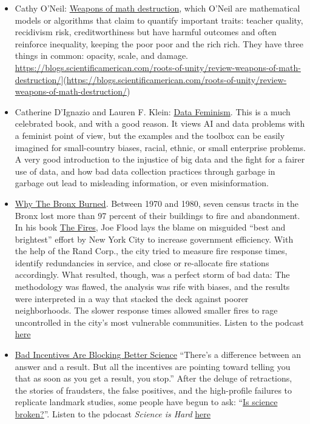 \documentclass[
  a4paper,
  openany, a4paper, oneside]{book}
\begin{document}
\begin{itemize}
\item
  Cathy O'Neil: \href{https://en.wikipedia.org/wiki/Weapons_of_Math_Destruction}{Weapons of math destruction}, which O'Neil are mathematical models or algorithms that claim to quantify important traits: teacher quality, recidivism risk, creditworthiness but have harmful outcomes and often reinforce inequality, keeping the poor poor and the rich rich. They have three things in common: opacity, scale, and damage. \url{https://blogs.scientificamerican.com/roots-of-unity/review-weapons-of-math-destruction/}{]}(\url{https://blogs.scientificamerican.com/roots-of-unity/review-weapons-of-math-destruction/})
\item
  Catherine D'Ignazio and Lauren F. Klein: \href{https://mitpress.mit.edu/books/data-feminism}{Data Feminism}. This is a much celebrated book, and with a good reason. It views AI and data problems with a feminist point of view, but the examples and the toolbox can be easily imagined for small-country biases, racial, ethnic, or small enterprise problems. A very good introduction to the injustice of big data and the fight for a fairer use of data, and how bad data collection practices through garbage in garbage out lead to misleading information, or even misinformation.
\item
  \href{https://fivethirtyeight.com/features/why-the-bronx-really-burned/}{Why The Bronx Burned}. Between 1970 and 1980, seven census tracts in the Bronx lost more than 97 percent of their buildings to fire and abandonment. In his book \href{https://www.amazon.com/Fires-Computer-Intentions-City-Determined/dp/1594485062}{The Fires}, Joe Flood lays the blame on misguided ``best and brightest'' effort by New York City to increase government efficiency. With the help of the Rand Corp., the city tried to measure fire response times, identify redundancies in service, and close or re-allocate fire stations accordingly. What resulted, though, was a perfect storm of bad data: The methodology was flawed, the analysis was rife with biases, and the results were interpreted in a way that stacked the deck against poorer neighborhoods. The slower response times allowed smaller fires to rage uncontrolled in the city's most vulnerable communities. Listen to the podcast \href{https://podcasts.apple.com/us/podcast/19-why-the-bronx-burned/id1011406983?i=1000391467912}{here}
\item
  \href{https://fivethirtyeight.com/features/podcast-bad-incentives-are-blocking-better-science/}{Bad Incentives Are Blocking Better Science} ``There's a difference between an answer and a result. But all the incentives are pointing toward telling you that as soon as you get a result, you stop.'' After the deluge of retractions, the stories of fraudsters, the false positives, and the high-profile failures to replicate landmark studies, some people have begun to ask: ``\href{https://fivethirtyeight.com/features/science-isnt-broken/}{Is science broken?}''. Listen to the pdocast \emph{Science is Hard} \href{https://podcasts.apple.com/us/podcast/10-science-is-hard/id1011406983?i=1000391467935}{here}

\end{itemize}
\end{document}
